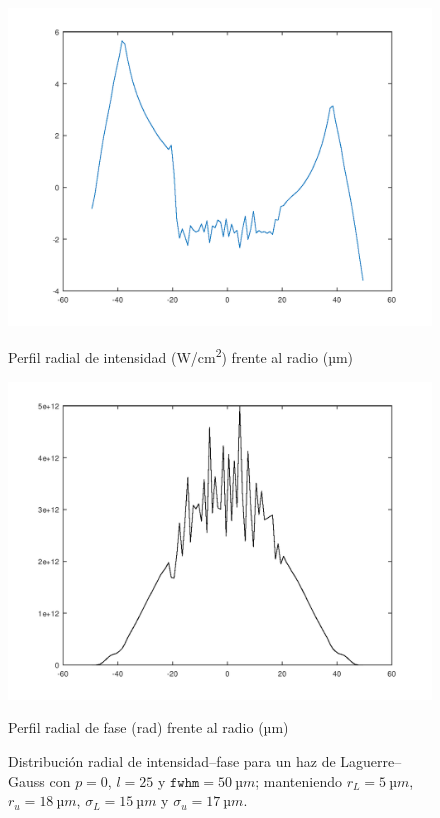 \begin{figure}[htbp]
  \centering
  \begin{subcaptionblock}{.4\textwidth}
    \centering
    \includegraphics[width=\textwidth]{Figuras/ch4_oam7u.png}
    \caption{Perfil radial de intensidad (\unit{W/cm^2}) frente al radio (\unit{µm})}\label{fig:ch4_oam7u}
  \end{subcaptionblock}
  \begin{subcaptionblock}{.4\textwidth}
    \centering
    \includegraphics[width=\textwidth]{Figuras/ch4_oam8u.png}
    \caption{Perfil radial de fase (\unit{rad}) frente al radio (\unit{µm})}\label{fig:ch4_oam8u}
  \end{subcaptionblock}
   \caption{Distribución radial de intensidad--fase para un haz de Laguerre--Gauss con $p=0$, $l=25$ y $\texttt{fwhm}=\qty{50}{µm}$; manteniendo $r_{L}=\qty{5}{µm}$, $r_{u}=\qty{18}{µm}$, $\sigma_{L}=\qty{15}{µm}$ y $\sigma_{u}=\qty{17}{µm}$.}
   \label{fig:4.37}
\end{figure}

